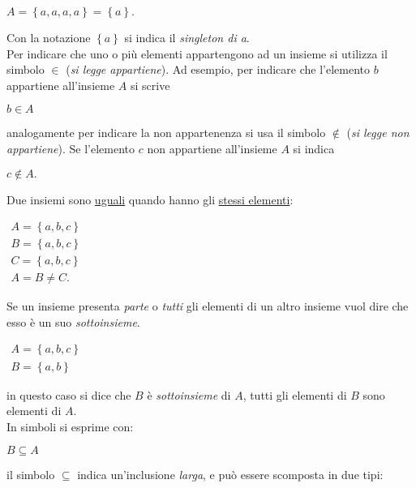 \documentclass[a4paper]{article}
\begin{document}
\begin{center}
	\begin{math}
		A = \left\lbrace a,a,a,a\right\rbrace = \left\lbrace a\right\rbrace.
	\end{math}
\end{center}
Con la notazione $ \left\lbrace a\right\rbrace  $ si indica il \textit{singleton di a}.
\\
Per indicare che uno o più elementi appartengono ad un insieme si utilizza il simbolo $\in$ (\textit{si legge appartiene}). Ad esempio, per indicare che l'elemento $b$ appartiene all'insieme $A$ si scrive
\begin{center}
	\begin{math}
		b \in A
	\end{math}
\end{center}
analogamente per indicare la non appartenenza si usa il simbolo $\notin$ (\textit{si legge non appartiene}). Se l'elemento $c$ non appartiene all'insieme $A$ si indica
\begin{center}
	\begin{math}
		c\notin A.
	\end{math}
\end{center}
Due insiemi sono \underline{uguali} quando hanno gli \underline{stessi elementi}:

\begin{center}
	\begin{math}
		\begin{array}{l}
			A = \left\lbrace a,b,c\right\rbrace \\
			B = \left\lbrace a,b,c\right\rbrace \\
			C = \left\lbrace a,b,c\right\rbrace \\
			A=B\not=C.
		\end{array}
	\end{math}
\end{center}
Se un insieme presenta \textit{parte} o \textit{tutti} gli elementi di un altro insieme vuol dire che esso è un suo \textit{sottoinsieme}.
\begin{center}
	\begin{math}
		\begin{array}{l}
			A = \left\lbrace a,b,c \right\rbrace \\
			B=\left\lbrace a,b \right\rbrace 
		\end{array}
	\end{math}
\end{center}
in questo caso si dice che $B$ è \textit{sottoinsieme} di $A$, tutti gli elementi di $B$ sono elementi di $A$.\\
In simboli si esprime con:
\begin{center}
	\begin{math}
		B \subseteq A
	\end{math}
\end{center}
il simbolo $\subseteq$ indica un'inclusione \textit{larga}, e può essere scomposta in due tipi:
\end{document}
